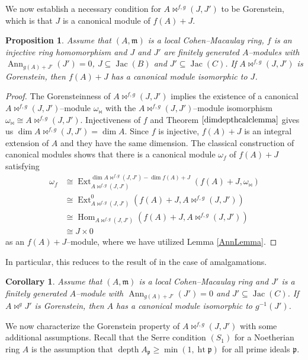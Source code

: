 \documentclass{amsart}%
\theoremstyle{plain}
\newtheorem{corollary}{Corollary}[section]
\newtheorem{proposition}{Proposition}[section]
\numberwithin{equation}{section}
\theoremstyle{definition}
\DeclareMathOperator{\jac}{Jac}
\DeclareMathOperator{\depth}{depth}
\DeclareMathOperator{\ext}{Ext}
\DeclareMathOperator{\Hom}{Hom}
\DeclareMathOperator{\Ann}{Ann}
\DeclareMathOperator{\height}{ht}
\begin{document}
We now establish a necessary condition for $A\bowtie^{f,g}(J,J')$ to be Gorenstein, which is that $J$ is a canonical module of $f(A)+J$.

\begin{proposition}\label{gorprop}
    Assume that $(A,\mathfrak{m})$ is a local Cohen--Macaulay ring, $f$ is an injective ring homomorphism and $J$ and $J'$ are finitely generated $A$--modules with $\Ann_{g(A)+J'}(J')=0$, $J\subseteq \jac(B)$ and $J'\subseteq \jac(C)$. If $A\bowtie^{f,g}(J,J')$ is Gorenstein, then $f(A)+J$ has a canonical module isomorphic to $J$.
\end{proposition}
\begin{proof}
    The Gorensteinness of $A\bowtie^{f,g}(J,J')$ implies the existence of a canonical $A\bowtie^{f,g}(J,J')$--module $\omega_{\bowtie}$ with the $A\bowtie^{f,g}(J,J')$--module isomorphism $\omega_{\bowtie}\cong A\bowtie^{f,g}(J,J')$. Injectiveness of $f$ and Theorem $\ref{dimdepthcalclemma}$ gives us $\dim A\bowtie^{f,g}(J,J')=\dim A$. Since $f$ is injective, $f(A)+J$ is an integral extension of $A$ and they have the same dimension. The classical construction of canonical modules  \cite[Theorem 21.15]{eisenbud} shows that there is a canonical module $\omega_f$ of $f(A)+J$ satisfying
    \begin{align*}
        \omega_f&\cong\ext_{A\bowtie^{f,g}(J,J')}^{\dim A\bowtie^{f,g}(J,J')-\dim f(A)+J }(f(A)+J,\omega_{\bowtie})\\
        &\cong\ext_{A\bowtie^{f,g}(J,J')}^0\left(f(A)+J,A\bowtie^{f,g}(J,J')\right)\\
&\cong \Hom_{A\bowtie^{f,g}(J,J')}\left(f(A)+J,A\bowtie^{f,g}(J,J')\right)\\
&\cong J\times0
    \end{align*}
    as an $f(A)+J$--module, where we have utilized Lemma \ref{AnnLemma}.
\end{proof}
In particular, this reduces to the result of \cite{DFF3} in the case of amalgamations.
\begin{corollary}
    Assume that $(A,\mathfrak{m})$ is a local Cohen--Macaulay ring and $J'$ is a finitely generated $A$--module with $\Ann_{g(A)+J'}(J')=0$ and $J'\subseteq \jac(C)$. If $A\bowtie^{g}J'$ is Gorenstein, then $A$ has a canonical module isomorphic to $g^{-1}(J')$.
\end{corollary}




We now characterize the Gorenstein property of $A\bowtie^{f,g}(J,J')$ with some additional assumptions. Recall that the Serre condition $(S_1)$ for a Noetherian ring $A$ is the assumption that $\depth A_{\mathfrak{p}}\ge \min(1,\height \mathfrak{p})$ for all prime ideals $\mathfrak{p}$.
\end{document}
